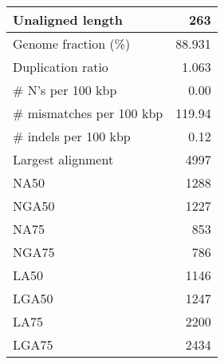\documentclass[12pt,a4paper]{article}
\begin{document}
\begin{table}[ht]
\begin{center}
\begin{tabular}{|l*{1}{|r}|}
Unaligned length & 263 \\ \hline
Genome fraction (\%) & 88.931 \\ \hline
Duplication ratio & 1.063 \\ \hline
\# N's per 100 kbp & 0.00 \\ \hline
\# mismatches per 100 kbp & 119.94 \\ \hline
\# indels per 100 kbp & 0.12 \\ \hline
Largest alignment & 4997 \\ \hline
NA50 & 1288 \\ \hline
NGA50 & 1227 \\ \hline
NA75 & 853 \\ \hline
NGA75 & 786 \\ \hline
LA50 & 1146 \\ \hline
LGA50 & 1247 \\ \hline
LA75 & 2200 \\ \hline
LGA75 & 2434 \\ \hline
\end{tabular}
\end{center}
\end{table}
\end{document}
